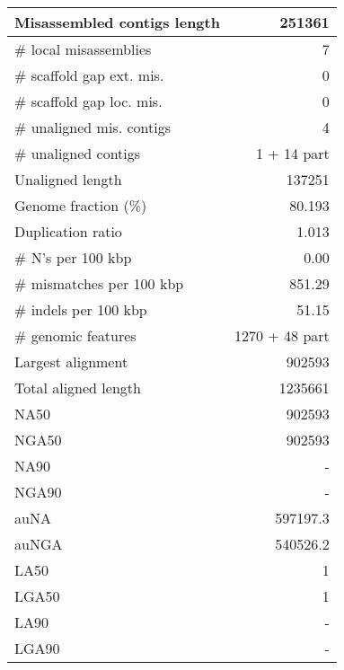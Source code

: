\documentclass[12pt,a4paper]{article}
\begin{document}
\begin{table}[ht]
\begin{center}
\begin{tabular}{|l*{1}{|r}|}
Misassembled contigs length & 251361 \\ \hline
\# local misassemblies & 7 \\ \hline
\# scaffold gap ext. mis. & 0 \\ \hline
\# scaffold gap loc. mis. & 0 \\ \hline
\# unaligned mis. contigs & 4 \\ \hline
\# unaligned contigs & 1 + 14 part \\ \hline
Unaligned length & 137251 \\ \hline
Genome fraction (\%) & 80.193 \\ \hline
Duplication ratio & 1.013 \\ \hline
\# N's per 100 kbp & 0.00 \\ \hline
\# mismatches per 100 kbp & 851.29 \\ \hline
\# indels per 100 kbp & 51.15 \\ \hline
\# genomic features & 1270 + 48 part \\ \hline
Largest alignment & 902593 \\ \hline
Total aligned length & 1235661 \\ \hline
NA50 & 902593 \\ \hline
NGA50 & 902593 \\ \hline
NA90 & - \\ \hline
NGA90 & - \\ \hline
auNA & 597197.3 \\ \hline
auNGA & 540526.2 \\ \hline
LA50 & 1 \\ \hline
LGA50 & 1 \\ \hline
LA90 & - \\ \hline
LGA90 & - \\ \hline
\end{tabular}
\end{center}
\end{table}
\end{document}
